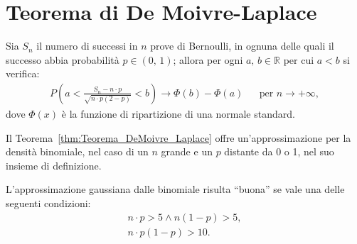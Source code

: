     \section{Teorema di De Moivre-Laplace}
        \begin{thm}\label{thm:Teorema_DeMoivre_Laplace}
            Sia $S_n$ il numero di successi in $n$ prove di Bernoulli, in ognuna delle quali il successo abbia probabilità $p \in (0,\,1)$; allora per ogni $a,\,b \in \mathbb{R}$ per cui $a < b$ si verifica:
            \begin{align*}
                P\left(a < \frac{S_n - n\cdot p}{\sqrt{n\cdot p(2-p)}} < b\right) \rightarrow \Phi(b) - \Phi(a) & & \text{per }n \rightarrow +\infty
            ,\end{align*}
            dove $\Phi(x)$ è la funzione di ripartizione di una normale standard.
        \end{thm}
        \begin{obsv}
            Il Teorema~\ref{thm:Teorema_DeMoivre_Laplace} offre un'approssimazione per la densità binomiale, nel caso di un $n$ grande e un $p$ distante da 0 o 1, nel suo insieme di definizione.

            L'approssimazione gaussiana dalle binomiale risulta ``buona'' se vale una delle seguenti condizioni:
            \begin{gather*}
                n \cdot p > 5 \land n(1-p) > 5, \\
                n \cdot p (1 - p) > 10.
            \end{gather*}
        \end{obsv}
